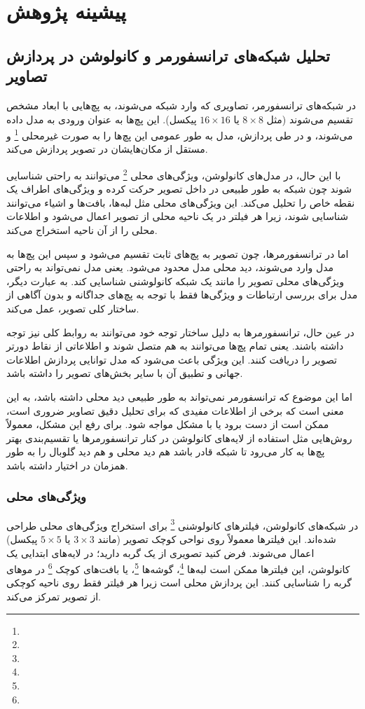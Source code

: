 \chapter{پیشینه پژوهش}


\section*{تحلیل شبکه‌های ترانسفورمر و کانولوشن در پردازش تصاویر}

در شبکه‌های ترانسفورمر، تصاویری که وارد شبکه می‌شوند، به پچ‌هایی با ابعاد مشخص تقسیم می‌شوند (مثل \(8 \times 8\) یا \(16 \times 16\) پیکسل). این پچ‌ها به عنوان ورودی به مدل داده می‌شوند، و در طی پردازش، مدل به طور عمومی این پچ‌ها را به صورت غیرمحلی \footnote{} و مستقل از مکان‌هایشان در تصویر پردازش می‌کند.


با این حال، در مدل‌های کانولوشن، ویژگی‌های محلی \footnote{} می‌توانند به راحتی شناسایی شوند چون شبکه به طور طبیعی در داخل تصویر حرکت کرده و ویژگی‌های اطراف یک نقطه خاص را تحلیل می‌کند. این ویژگی‌های محلی مثل لبه‌ها، بافت‌ها و اشیاء می‌توانند شناسایی شوند، زیرا هر فیلتر در یک ناحیه محلی از تصویر اعمال می‌شود و اطلاعات محلی را از آن ناحیه استخراج می‌کند.


اما در ترانسفورمرها، چون تصویر به پچ‌های ثابت تقسیم می‌شود و سپس این پچ‌ها به مدل وارد می‌شوند، دید محلی مدل محدود می‌شود. یعنی مدل نمی‌تواند به راحتی ویژگی‌های محلی تصویر را مانند یک شبکه کانولوشنی شناسایی کند. به عبارت دیگر، مدل برای بررسی ارتباطات و ویژگی‌ها فقط با توجه به پچ‌های جداگانه و بدون آگاهی از ساختار کلی تصویر، عمل می‌کند.

در عین حال، ترانسفورمرها به دلیل ساختار توجه خود می‌توانند به روابط کلی  نیز توجه داشته باشند. یعنی تمام پچ‌ها می‌توانند به هم متصل شوند و اطلاعاتی از نقاط دورتر تصویر را دریافت کنند. این ویژگی باعث می‌شود که مدل توانایی پردازش اطلاعات جهانی و تطبیق آن با سایر بخش‌های تصویر را داشته باشد.

اما این موضوع که ترانسفورمر نمی‌تواند به طور طبیعی دید محلی داشته باشد، به این معنی است که برخی از اطلاعات مفیدی که برای تحلیل دقیق تصاویر ضروری است، ممکن است از دست برود یا با مشکل مواجه شود. برای رفع این مشکل، معمولاً روش‌هایی مثل استفاده از لایه‌های کانولوشن در کنار ترانسفورمرها یا تقسیم‌بندی بهتر پچ‌ها به کار می‌رود تا شبکه قادر باشد هم دید محلی و هم دید گلوبال را به طور همزمان در اختیار داشته باشد.

\subsection{ویژگی‌های محلی}
در شبکه‌های کانولوشن، فیلترهای کانولوشنی \footnote{} برای استخراج ویژگی‌های محلی طراحی شده‌اند. این فیلترها معمولاً روی نواحی کوچک تصویر (مانند \(3 \times 3\) یا \(5 \times 5\) پیکسل) اعمال می‌شوند. فرض کنید تصویری از یک گربه دارید؛ در لایه‌های ابتدایی یک کانولوشن، این فیلترها ممکن است لبه‌ها \footnote{}، گوشه‌ها \footnote{}، یا بافت‌های کوچک \footnote{} در موهای گربه را شناسایی کنند. این پردازش محلی است زیرا هر فیلتر فقط روی ناحیه کوچکی از تصویر تمرکز می‌کند.


